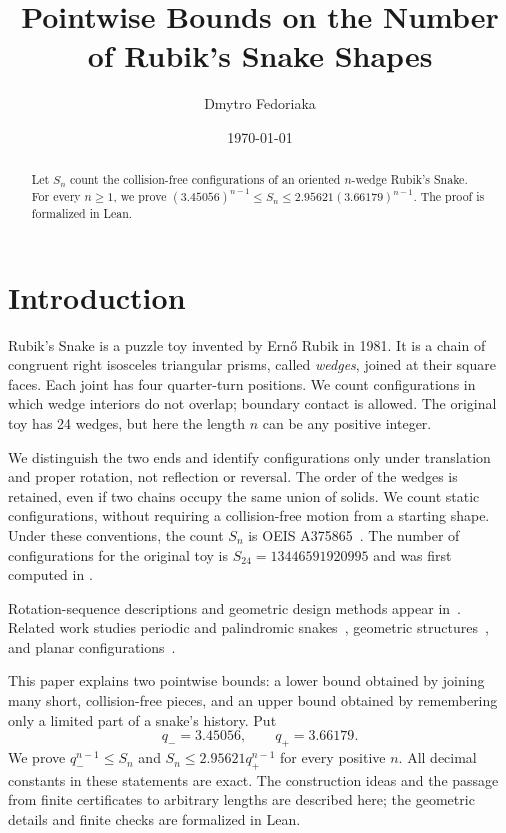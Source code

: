\documentclass[11pt]{article}
\title{Pointwise Bounds on the Number of Rubik's Snake Shapes}
\author{Dmytro Fedoriaka}
\date{\today}
\newcommand{\qminus}{q_-}
\newcommand{\qplus}{q_+}
\begin{document}
\maketitle

\begin{abstract}
Let $S_n$ count the collision-free configurations of an oriented
$n$-wedge Rubik's Snake. For every $n\geq1$, we prove
$(3.45056)^{n-1}\leq S_n\leq
2.95621(3.66179)^{n-1}$. The proof is formalized in Lean.
\end{abstract}

\section{Introduction}

Rubik's Snake is a puzzle toy invented by Ern\H{o} Rubik in
1981. It is a chain of congruent right isosceles triangular
prisms, called \emph{wedges}, joined at their square faces. Each joint
has four quarter-turn positions. We count configurations in which
wedge interiors do not overlap; boundary contact is allowed.
The original toy has 24 wedges, but here the length $n$ can be any
positive integer.

We distinguish the two ends and identify configurations only under
translation and proper rotation, not reflection or reversal. The
order of the wedges is retained, even if two chains occupy the same
union of solids. We count static configurations, without requiring
a collision-free motion from a starting shape. Under these conventions,
the count $S_n$ is OEIS A375865~\cite{oeisA375865}.
The number of configurations for the original toy is
$S_{24}=13446591920995$
and was first computed in \cite{aylett2011}.


Rotation-sequence descriptions and geometric design methods appear
in~\cite{li2020,soul2022}. Related work studies periodic and palindromic
snakes~\cite{palindromic2021}, geometric structures~\cite{chen2023},
and planar configurations~\cite{grotto2024}.

This paper explains two pointwise bounds: a lower bound obtained by
joining many short, collision-free pieces, and an upper bound obtained
by remembering only a limited part of a snake's history. Put
\[
 \qminus=3.45056,\qquad \qplus=3.66179.
\]
We prove $\qminus^{n-1}\leq S_n$ and
$S_n\leq2.95621\qplus^{n-1}$ for every positive $n$.
All decimal constants in these statements are exact.
The construction ideas and the passage from finite certificates to
arbitrary lengths are described here; the geometric details and finite
checks are formalized in Lean.
\end{document}
